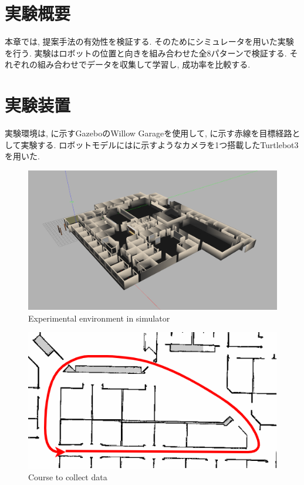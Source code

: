 
\section{実験概要}
本章では, 提案手法の有効性を検証する. そのためにシミュレータを用いた実験を行う. 実験はロボットの位置と向きを組み合わせた全8パターンで検証する. それぞれの組み合わせでデータを収集して学習し, 成功率を比較する. 

\section{実験装置}
実験環境は, に示すGazebo\cite{gazebo}のWillow Garage\cite{willow}を使用して, に示す赤線を目標経路として実験する. ロボットモデルにはに示すようなカメラを1つ搭載したTurtlebot3\cite{turtlebot3}を用いた. 

\begin{figure}[h]
  \centering
  \includegraphics[keepaspectratio, scale=0.15]{images/gazebo.png}
  \caption{Experimental environment in simulator}
  \label{Fig:gazebo}
  \end{figure}

\newpage
\vspace{20mm}
\begin{figure}[h]
  \centering
  \includegraphics[keepaspectratio, scale=0.5]{images/willow-path.png}
  \caption{Course to collect data}
  \label{Fig:willow-garage}
  \end{figure}

